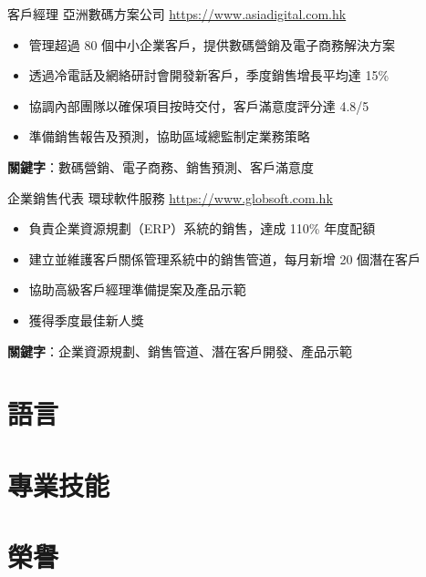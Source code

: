 \documentclass[a4paper, serif, 10pt]{moderncv}
\begin{document}
        {客戶經理}
        {亞洲數碼方案公司}
        {\url{https://www.asiadigital.com.hk}}
        {}
        {\begin{itemize}
\item 管理超過 80 個中小企業客戶，提供數碼營銷及電子商務解決方案
\item 透過冷電話及網絡研討會開發新客戶，季度銷售增長平均達 15\%
\item 協調內部團隊以確保項目按時交付，客戶滿意度評分達 4.8/5
\item 準備銷售報告及預測，協助區域總監制定業務策略
\end{itemize}
\textbf{關鍵字}：數碼營銷、電子商務、銷售預測、客戶滿意度}

        {企業銷售代表}
        {環球軟件服務}
        {\url{https://www.globsoft.com.hk}}
        {}
        {\begin{itemize}
\item 負責企業資源規劃（ERP）系統的銷售，達成 110\% 年度配額
\item 建立並維護客戶關係管理系統中的銷售管道，每月新增 20 個潛在客戶
\item 協助高級客戶經理準備提案及產品示範
\item 獲得季度最佳新人獎
\end{itemize}
\textbf{關鍵字}：企業資源規劃、銷售管道、潛在客戶開發、產品示範}
\section{語言}

\section{專業技能}

\section{榮譽}
\end{document}
